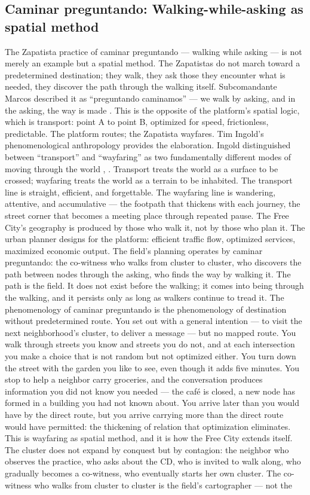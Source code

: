 \subsection{Caminar preguntando: Walking-while-asking as spatial method}

The Zapatista practice of caminar preguntando — walking while asking — is not merely an example but a spatial method. The Zapatistas do not march toward a predetermined destination; they walk, they ask those they encounter what is needed, they discover the path through the walking itself. Subcomandante Marcos described it as “preguntando caminamos” — we walk by asking, and in the asking, the way is made \cite{marcos_1994}. This is the opposite of the platform’s spatial logic, which is transport: point A to point B, optimized for speed, frictionless, predictable. The platform routes; the Zapatista wayfares. Tim Ingold’s phenomenological anthropology provides the elaboration. Ingold distinguished between “transport” and “wayfaring” as two fundamentally different modes of moving through the world \cite[pp.~75--89]{ingold_2007}, \cite[pp.~12--35]{ingold_2011}. Transport treats the world as a surface to be crossed; wayfaring treats the world as a terrain to be inhabited. The transport line is straight, efficient, and forgettable. The wayfaring line is wandering, attentive, and accumulative — the footpath that thickens with each journey, the street corner that becomes a meeting place through repeated pause. The Free City’s geography is produced by those who walk it, not by those who plan it. The urban planner designs for the platform: efficient traffic flow, optimized services, maximized economic output. The field’s planning operates by caminar preguntando: the co-witness who walks from cluster to cluster, who discovers the path between nodes through the asking, who finds the way by walking it. The path is the field. It does not exist before the walking; it comes into being through the walking, and it persists only as long as walkers continue to tread it. The phenomenology of caminar preguntando is the phenomenology of destination without predetermined route. You set out with a general intention — to visit the next neighborhood’s cluster, to deliver a message — but no mapped route. You walk through streets you know and streets you do not, and at each intersection you make a choice that is not random but not optimized either. You turn down the street with the garden you like to see, even though it adds five minutes. You stop to help a neighbor carry groceries, and the conversation produces information you did not know you needed — the café is closed, a new node has formed in a building you had not known about. You arrive later than you would have by the direct route, but you arrive carrying more than the direct route would have permitted: the thickening of relation that optimization eliminates. This is wayfaring as spatial method, and it is how the Free City extends itself. The cluster does not expand by conquest but by contagion: the neighbor who observes the practice, who asks about the CD, who is invited to walk along, who gradually becomes a co-witness, who eventually starts her own cluster. The co-witness who walks from cluster to cluster is the field’s cartographer — not the 